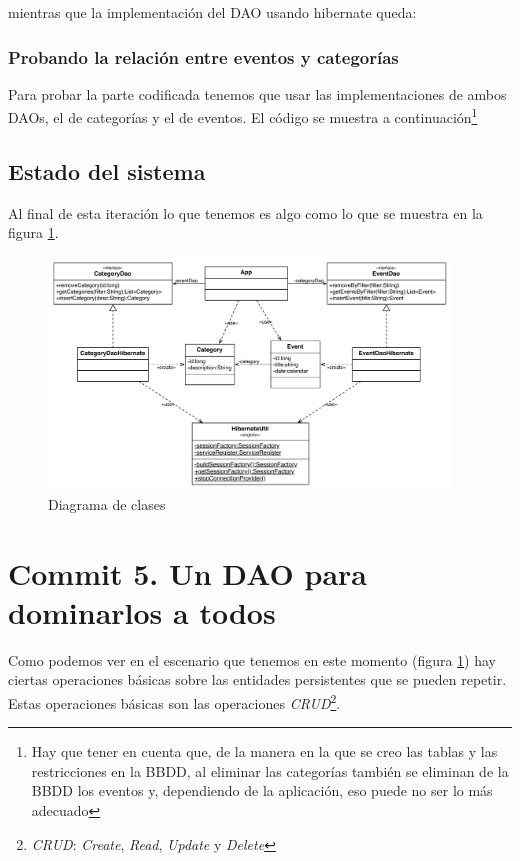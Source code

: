\documentclass{article}
\begin{document}
	mientras que la implementación del DAO usando hibernate queda:


\subsubsection{Probando la relación entre eventos y categorías}
	Para probar la parte codificada tenemos que usar las implementaciones de ambos DAOs, el de categorías y el de eventos. El código se muestra a continuación\footnote{Hay que tener en cuenta que, de la manera en la que se creo las tablas y las restricciones en la BBDD, al eliminar las categorías también se eliminan de la BBDD los eventos y, dependiendo de la aplicación, eso puede no ser lo más adecuado}


\subsection{Estado del sistema}
	Al final de esta iteración lo que tenemos es algo como lo que se muestra en la figura \ref{fig:c04:UmlClass}.
\begin{figure}[h]
  \centering
    \includegraphics[width=0.95\textwidth]{commit04/img/UmlClass.pdf}
  \caption{Diagrama de clases}
  \label{fig:c04:UmlClass}
\end{figure}	

\section{Commit 5. Un DAO para dominarlos a todos}

	Como podemos ver en el escenario que tenemos en este momento (figura \ref{fig:c04:UmlClass}) hay ciertas operaciones básicas sobre las entidades persistentes que se pueden repetir. Estas operaciones básicas son las operaciones \emph{CRUD}\footnote{\emph{CRUD}: \emph{Create}, \emph{Read}, \emph{Update} y \emph{Delete}}.
\end{document}
